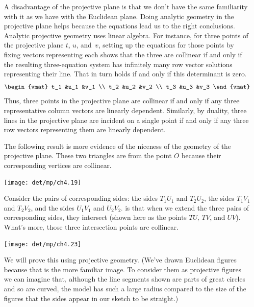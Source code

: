 A disadvantage of the projective plane is that we don't have the 
same familiarity with it as we have with the Euclidean plane.
Doing analytic geometry in the projective plane helps 
because the equations lead us to the right conclusions.
Analytic projective geometry uses linear algebra.
For instance, for three points of the projective plane
$t$, $u$, and~$v$, 
setting up the equations for those points by fixing vectors representing each
shows that the three are collinear if and only if the resulting three-equation
system has infinitely many row vector solutions
representing their line.
That in turn holds if and only if this determinant is zero.
\begin{equation*}
  \begin{vmat}
    t_1  &u_1  &v_1  \\
    t_2  &u_2  &v_2  \\
    t_3  &u_3  &v_3  
  \end{vmat}
\end{equation*}
Thus, three points in the projective plane are collinear if and only if
any three representative column vectors are linearly dependent.
Similarly, by duality, 
three lines in the projective plane are incident on a single
point if and only if any three row vectors representing them are linearly
dependent.

The following result is more evidence of the niceness
of the geometry of the projective plane.
These two triangles are
 from the point $O$ 
because their corresponding vertices are collinear.
\begin{center}
  \texttt{[image: det/mp/ch4.19]}
\end{center}
Consider the pairs of corresponding sides:
the sides $T_1U_1$ and $T_2U_2$, 
the sides $T_1V_1$ and $T_2V_2$, 
and the sides $U_1V_1$ and $U_2V_2$.
is that when we extend the three pairs of corresponding 
sides, they intersect
(shown here as the points $TU$, $TV$, and $UV$).
What's more, those three intersection points are collinear.
\begin{center}
  \texttt{[image: det/mp/ch4.23]}
\end{center}
We will prove this using projective geometry.
(We've drawn Euclidean figures because that is the more familiar image.
To consider them as projective figures
we can imagine that, although the line segments shown are parts of great 
circles and so are curved,
the model has such a large radius compared to the size of the 
figures that the sides appear in our sketch to be straight.)

